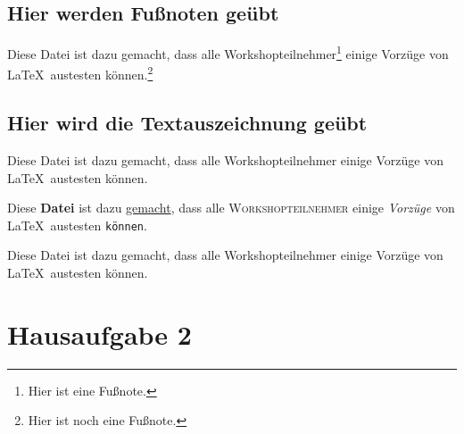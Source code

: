 \documentclass[10pt,paper=a4,abstracton]{scrartcl}
\begin{document}
\subsection[Fußnoten]{Hier werden Fußnoten geübt}

Diese Datei ist dazu gemacht, dass alle Workshopteilnehmer\footnote{Hier ist eine Fußnote.} einige Vorzüge von \LaTeX\ austesten können.\footnote{Hier ist noch eine Fußnote.}


\subsection[Textauszeichnung]{Hier wird die Textauszeichnung geübt}

Diese Datei ist {\tiny dazu} gemacht, dass {\Huge alle} Workshopteilnehmer einige {\Large Vorzüge} von \LaTeX\ austesten können.

Diese \textbf{Datei} ist dazu \underline{gemacht}, dass alle \textsc{Workshopteilnehmer} einige \emph{Vorzüge} von \LaTeX\ austesten \texttt{können}.

\noindent Diese Datei ist dazu gemacht, dass alle Workshopteilnehmer einige Vorzüge von \LaTeX\ austesten können.


\section{Hausaufgabe 2}
\end{document}
